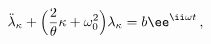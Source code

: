 \begin{equation}
\ddot\lambda_\kappa +\Bigl(\frac2\theta\kappa+\omega_0^2\Bigr) 
\lambda_\kappa = b\ee^{\ii\omega t} \,,
\end{equation}

